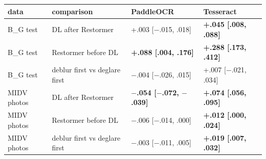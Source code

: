 \begin{tabular}{llll}
\toprule
data & comparison & PaddleOCR & Tesseract \\
\midrule
B\_G test & DL after Restormer & +.003 [$-$.015, .018] & \textbf{+.045 [.008, .088]} \\
B\_G test & Restormer before DL & \textbf{+.088 [.004, .176]} & \textbf{+.288 [.173, .412]} \\
B\_G test & deblur first vs deglare first & $-$.004 [$-$.026, .015] & +.007 [$-$.021, .034] \\
MIDV photos & DL after Restormer & \textbf{$-$.054 [$-$.072, $-$.039]} & \textbf{+.074 [.056, .095]} \\
MIDV photos & Restormer before DL & $-$.006 [$-$.014, .000] & \textbf{+.012 [.000, .024]} \\
MIDV photos & deblur first vs deglare first & $-$.003 [$-$.011, .005] & \textbf{+.019 [.007, .032]} \\
\bottomrule
\end{tabular}
